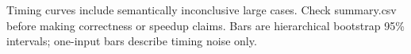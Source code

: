 \documentclass{article}
\begin{document}
\noindent Timing curves include semantically inconclusive large cases. Check summary.csv before making correctness or speedup claims. Bars are hierarchical bootstrap 95\% intervals; one-input bars describe timing noise only.

\quad
\par\medskip
\end{document}
